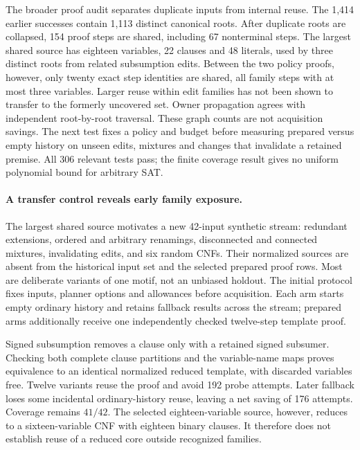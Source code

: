 \documentclass[11pt,a4paper]{article}
\numberwithin{equation}{section}
\theoremstyle{plain}
\theoremstyle{definition}
\theoremstyle{remark}
\begin{document}
The broader proof audit separates duplicate inputs from internal reuse. The
1,414 earlier successes contain 1,113 distinct canonical roots. After duplicate
roots are collapsed, 154 proof steps are shared, including 67 nonterminal steps.
The largest shared source has eighteen variables, 22 clauses and 48 literals,
used by three distinct roots from related subsumption edits. Between the two
policy proofs, however, only twenty exact step identities are shared, all family
steps with at most three variables. Larger reuse within edit families has not
been shown to transfer to the formerly uncovered set. Owner propagation agrees
with independent root-by-root traversal. These graph counts are not acquisition
savings. The next test fixes a policy and budget before measuring prepared versus
empty history on unseen edits, mixtures and changes that invalidate a retained
premise. All 306 relevant tests pass; the finite coverage result gives no uniform
polynomial bound for arbitrary SAT.

\paragraph{A transfer control reveals early family exposure.}
The largest shared source motivates a new 42-input synthetic stream: redundant
extensions, ordered and arbitrary renamings, disconnected and connected mixtures,
invalidating edits, and six random CNFs. Their normalized sources are absent from
the historical input set and the selected prepared proof rows. Most are deliberate
variants of one motif, not an unbiased holdout. The initial protocol fixes inputs,
planner options and allowances before acquisition. Each arm starts empty ordinary
history and retains fallback results across the stream; prepared arms additionally
receive one independently checked twelve-step template proof.

Signed subsumption removes a clause only with a retained signed subsumer. Checking
both complete clause partitions and the variable-name maps proves equivalence to
an identical normalized reduced template, with discarded variables free. Twelve
variants reuse the proof and avoid 192 probe attempts. Later fallback loses some
incidental ordinary-history reuse, leaving a net saving of 176 attempts. Coverage
remains $41/42$. The selected eighteen-variable source, however, reduces to a
sixteen-variable CNF with eighteen binary clauses. It therefore does not establish
reuse of a reduced core outside recognized families.
\end{document}
